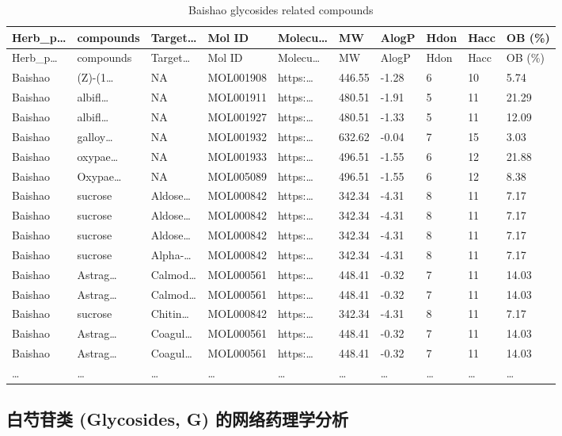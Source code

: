 \documentclass[
]{article}
\begin{document}
\begin{longtable}[]{@{}llllllllll@{}}
\caption{\label{tab:Baishao-glycosides-related-compounds}Baishao glycosides related compounds}\tabularnewline
\toprule
Herb\_p\ldots{} & compounds & Target\ldots{} & Mol ID & Molecu\ldots{} & MW & AlogP & Hdon & Hacc & OB (\%)\tabularnewline
\midrule
\endfirsthead
\toprule
Herb\_p\ldots{} & compounds & Target\ldots{} & Mol ID & Molecu\ldots{} & MW & AlogP & Hdon & Hacc & OB (\%)\tabularnewline
\midrule
\endhead
Baishao & (Z)-(1\ldots{} & NA & MOL001908 & https:\ldots{} & 446.55 & -1.28 & 6 & 10 & 5.74\tabularnewline
Baishao & albifl\ldots{} & NA & MOL001911 & https:\ldots{} & 480.51 & -1.91 & 5 & 11 & 21.29\tabularnewline
Baishao & albifl\ldots{} & NA & MOL001927 & https:\ldots{} & 480.51 & -1.33 & 5 & 11 & 12.09\tabularnewline
Baishao & galloy\ldots{} & NA & MOL001932 & https:\ldots{} & 632.62 & -0.04 & 7 & 15 & 3.03\tabularnewline
Baishao & oxypae\ldots{} & NA & MOL001933 & https:\ldots{} & 496.51 & -1.55 & 6 & 12 & 21.88\tabularnewline
Baishao & Oxypae\ldots{} & NA & MOL005089 & https:\ldots{} & 496.51 & -1.55 & 6 & 12 & 8.38\tabularnewline
Baishao & sucrose & Aldose\ldots{} & MOL000842 & https:\ldots{} & 342.34 & -4.31 & 8 & 11 & 7.17\tabularnewline
Baishao & sucrose & Aldose\ldots{} & MOL000842 & https:\ldots{} & 342.34 & -4.31 & 8 & 11 & 7.17\tabularnewline
Baishao & sucrose & Aldose\ldots{} & MOL000842 & https:\ldots{} & 342.34 & -4.31 & 8 & 11 & 7.17\tabularnewline
Baishao & sucrose & Alpha-\ldots{} & MOL000842 & https:\ldots{} & 342.34 & -4.31 & 8 & 11 & 7.17\tabularnewline
Baishao & Astrag\ldots{} & Calmod\ldots{} & MOL000561 & https:\ldots{} & 448.41 & -0.32 & 7 & 11 & 14.03\tabularnewline
Baishao & Astrag\ldots{} & Calmod\ldots{} & MOL000561 & https:\ldots{} & 448.41 & -0.32 & 7 & 11 & 14.03\tabularnewline
Baishao & sucrose & Chitin\ldots{} & MOL000842 & https:\ldots{} & 342.34 & -4.31 & 8 & 11 & 7.17\tabularnewline
Baishao & Astrag\ldots{} & Coagul\ldots{} & MOL000561 & https:\ldots{} & 448.41 & -0.32 & 7 & 11 & 14.03\tabularnewline
Baishao & Astrag\ldots{} & Coagul\ldots{} & MOL000561 & https:\ldots{} & 448.41 & -0.32 & 7 & 11 & 14.03\tabularnewline
\ldots{} & \ldots{} & \ldots{} & \ldots{} & \ldots{} & \ldots{} & \ldots{} & \ldots{} & \ldots{} & \ldots{}\tabularnewline
\bottomrule
\end{longtable}

\hypertarget{ux767dux828dux82f7ux7c7b-glycosides-g-ux7684ux7f51ux7edcux836fux7406ux5b66ux5206ux6790}{%
\subsection{白芍苷类 (Glycosides, G) 的网络药理学分析}\label{ux767dux828dux82f7ux7c7b-glycosides-g-ux7684ux7f51ux7edcux836fux7406ux5b66ux5206ux6790}}
\end{document}
